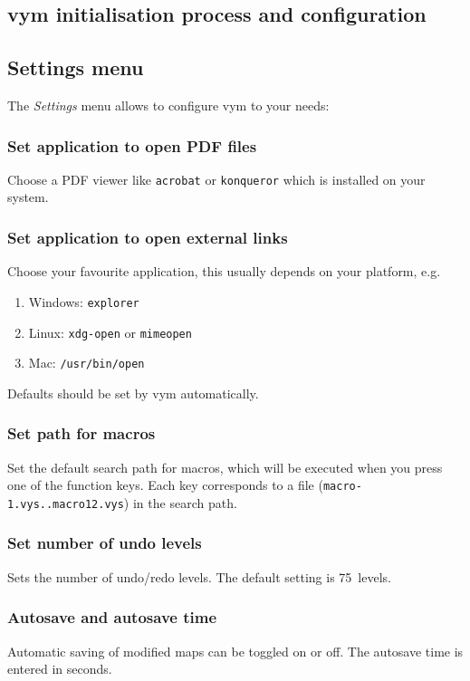\documentclass[12pt,a4paper]{article}
\newcommand{\vym}{{\sc vym }}
\begin{document}
\begin{appendix}

\section{\vym initialisation process and configuration}
\subsection {Settings menu} \label{settings}
    The {\em Settings} menu allows to configure \vym to your needs:

\subsubsection*{Set application to open PDF files} Choose a PDF
    viewer like {\tt acrobat} or {\tt konqueror} which is installed on
    your system.

\subsubsection*{Set application to open external links}
    Choose your favourite application, this usually depends on your
    platform, e.g.
    \begin{enumerate}
        \item Windows: {\tt explorer}
        \item Linux: {\tt xdg-open} or {\tt mimeopen}
        \item Mac: {\tt /usr/bin/open}
    \end{enumerate}
    Defaults should be set by \vym automatically.

\subsubsection*{Set path for macros}
    Set the default search path for macros, which will be executed when
    you press one of the function keys. Each key corresponds to a file
    ({\tt macro-1.vys..macro12.vys}) in the search path.

\subsubsection*{Set number of undo levels}
    Sets the number of undo/redo levels. The default setting is
    75~levels.

\subsubsection*{Autosave and autosave time}
    Automatic saving of modified maps can be toggled on or off. The
    autosave time is entered in seconds.


\end{appendix}
\end{document}

